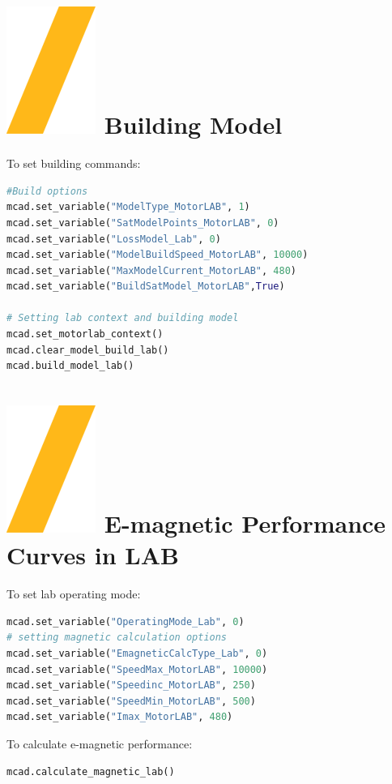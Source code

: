 \documentclass[landscape]{article}
\begin{document}
\begin{multicols}{3}
\section{\includegraphics[height=\fontcharht\font`\S]{slash.png} Building Model}
To set building commands:
\begin{lstlisting}[language=Python]
#Build options
mcad.set_variable("ModelType_MotorLAB", 1)
mcad.set_variable("SatModelPoints_MotorLAB", 0)
mcad.set_variable("LossModel_Lab", 0)
mcad.set_variable("ModelBuildSpeed_MotorLAB", 10000)
mcad.set_variable("MaxModelCurrent_MotorLAB", 480)
mcad.set_variable("BuildSatModel_MotorLAB",True)

# Setting lab context and building model
mcad.set_motorlab_context()
mcad.clear_model_build_lab()
mcad.build_model_lab()
\end{lstlisting}
\section{\includegraphics[height=\fontcharht\font`\S]{slash.png} E-magnetic Performance Curves in LAB}
To set lab operating mode:
\begin{lstlisting}[language=Python]
mcad.set_variable("OperatingMode_Lab", 0)
# setting magnetic calculation options
mcad.set_variable("EmagneticCalcType_Lab", 0)
mcad.set_variable("SpeedMax_MotorLAB", 10000)
mcad.set_variable("Speedinc_MotorLAB", 250)
mcad.set_variable("SpeedMin_MotorLAB", 500)
mcad.set_variable("Imax_MotorLAB", 480)	
\end{lstlisting}
To calculate e-magnetic performance:
\begin{lstlisting}[language=Python]
mcad.calculate_magnetic_lab()
\end{lstlisting}


\end{multicols}
\end{document}
